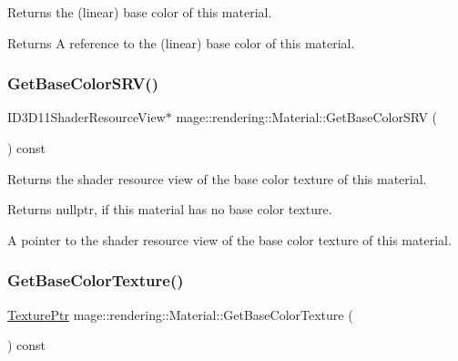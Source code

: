Returns the (linear) base color of this material.

\begin{DoxyReturn}{Returns}
A reference to the (linear) base color of this material. 
\end{DoxyReturn}
\mbox{\label{classmage_1_1rendering_1_1_material_a363d85135b18e4e8c8a0b1d2fd88a435}} 
\subsubsection{\texorpdfstring{Get\+Base\+Color\+S\+R\+V()}{GetBaseColorSRV()}}
{\footnotesize\ttfamily I\+D3\+D11\+Shader\+Resource\+View$\ast$ mage\+::rendering\+::\+Material\+::\+Get\+Base\+Color\+S\+RV (\begin{DoxyParamCaption}{ }\end{DoxyParamCaption}) const\hspace{0.3cm}{\ttfamily [noexcept]}}

Returns the shader resource view of the base color texture of this material.

\begin{DoxyReturn}{Returns}
{\ttfamily nullptr}, if this material has no base color texture. 

A pointer to the shader resource view of the base color texture of this material. 
\end{DoxyReturn}
\mbox{\label{classmage_1_1rendering_1_1_material_ac9ce1aff5b5e3d34ae83eb194786cebe}} 
\subsubsection{\texorpdfstring{Get\+Base\+Color\+Texture()}{GetBaseColorTexture()}}
{\footnotesize\ttfamily \mbox{\hyperlink{namespacemage_1_1rendering_a6f3ae54f825328465b0cdde0f0de4a36}{Texture\+Ptr}} mage\+::rendering\+::\+Material\+::\+Get\+Base\+Color\+Texture (\begin{DoxyParamCaption}{ }\end{DoxyParamCaption}) const\hspace{0.3cm}{\ttfamily [noexcept]}}

